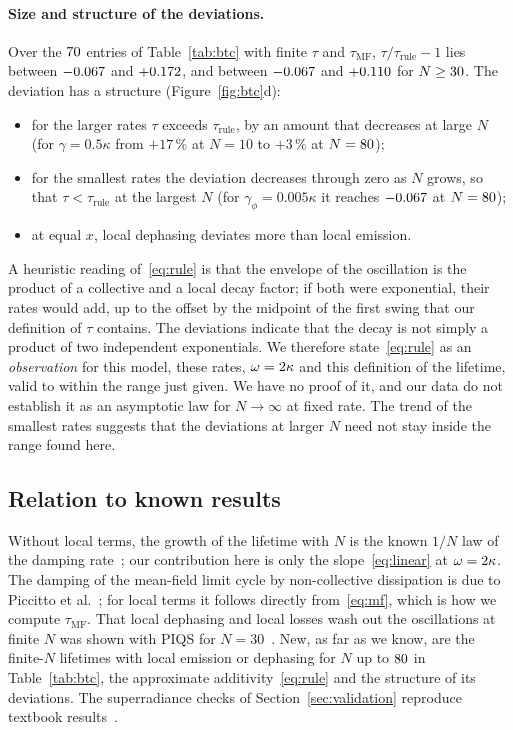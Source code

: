 \documentclass[11pt]{article}
\newcommand{\taumf}{\tau_{\mathrm{MF}}}
\newcommand{\taurule}{\tau_{\mathrm{rule}}}
\begin{document}
\paragraph{Size and structure of the deviations.} Over the $70$ entries of Table~\ref{tab:btc} with finite
$\tau$ and $\taumf$, $\tau/\taurule-1$ lies between $-0.067$ and $+0.172$, and between $-0.067$ and
$+0.110$ for $N\ge30$. The deviation has a structure (Figure~\ref{fig:btc}d):
\begin{itemize}\itemsep0pt
\item for the larger rates $\tau$ exceeds $\taurule$, by an amount that decreases at large $N$ (for $\gamma=0.5\kappa$
from $+17\,\%$ at $N=10$ to $+3\,\%$ at $N=80$);
\item for the smallest rates the deviation decreases through zero as $N$ grows, so that $\tau<\taurule$ at the largest
$N$ (for $\gamma_\phi=0.005\kappa$ it reaches $-0.067$ at $N=80$);
\item at equal $x$, local dephasing deviates more than local emission.
\end{itemize}
A heuristic reading of~\eqref{eq:rule} is that the envelope of the oscillation is the product of a collective and a
local decay factor; if both were exponential, their rates would add, up to the offset by the midpoint of the first
swing that our definition of $\tau$ contains. The deviations indicate that the decay is not simply a product of two
independent exponentials. We therefore
state~\eqref{eq:rule} as an \emph{observation} for this model, these rates, $\omega=2\kappa$ and this
definition of the lifetime, valid to within the range just given. We have no proof of it, and our data do not
establish it as an asymptotic law for $N\to\infty$ at fixed rate. The trend of the smallest rates suggests that the
deviations at larger $N$ need not stay inside the range found here.

\subsection{Relation to known results}\label{sec:btc-known}

Without local terms, the growth of the lifetime with $N$ is the known $1/N$ law of the damping
rate~\cite{liu2026,nemeth2025}; our contribution here is only the slope~\eqref{eq:linear} at $\omega=2\kappa$.
The damping of the mean-field limit cycle by non-collective dissipation is due to Piccitto et
al.~\cite{piccitto2021}; for local terms it follows directly from~\eqref{eq:mf}, which is how we compute $\taumf$.
That local dephasing and local losses wash out the oscillations at finite $N$ was shown with PIQS for
$N=30$~\cite{shammah2018}. New, as far as we know, are the finite-$N$ lifetimes with local emission or dephasing for
$N$ up to $80$ in Table~\ref{tab:btc}, the approximate additivity~\eqref{eq:rule} and the structure of its
deviations. The superradiance checks of Section~\ref{sec:validation} reproduce textbook results~\cite{dicke1954,gross1982}.
\end{document}
